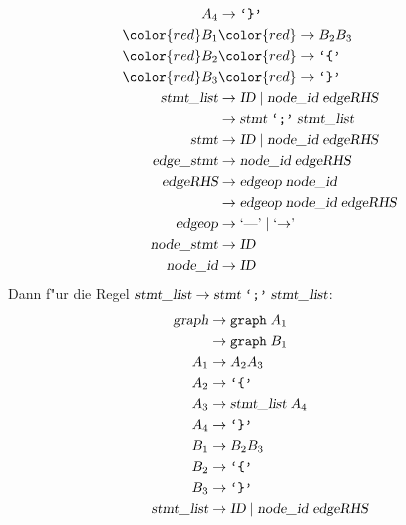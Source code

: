 \begin{loesung}
\begin{teilaufgaben}
\begin{align*}
A_4                &\rightarrow \texttt{`\}'}\\
\color{red}B_1     &\color{red}\rightarrow B_2B_3\\
\color{red}B_2     &\color{red}\rightarrow \texttt{`\{'}\\
\color{red}B_3     &\color{red}\rightarrow \texttt{`\}'}\\
\textsl{stmt\_list}&\rightarrow \textsl{ID}\; |\;
                                \textsl{node\_id}\; \textsl{edgeRHS} \\
                   &\rightarrow \textsl{stmt}\; \texttt{`;'}\; \textsl{stmt\_list}\\
\textsl{stmt}      &\rightarrow \textsl{ID}\; |\;
                                \textsl{node\_id}\; \textsl{edgeRHS} \\
\textsl{edge\_stmt}&\rightarrow \textsl{node\_id}\; \textsl{edgeRHS} \\
\textsl{edgeRHS}   &\rightarrow \textsl{edgeop}\; \textsl{node\_id}\\
                   &\rightarrow \textsl{edgeop}\; \textsl{node\_id}\; \textsl{edgeRHS}\\
\textsl{edgeop}    &\rightarrow \textrm{`\text{---}'}\; |\; \textrm{`$\rightarrow$'}\; \\
\textsl{node\_stmt}&\rightarrow \textsl{ID} \\
\textsl{node\_id}  &\rightarrow \textsl{ID}
\end{align*}
Dann f"ur die Regel
$\textsl{stmt\_list}\rightarrow \textsl{stmt}\; \texttt{`;'}\; \textsl{stmt\_list}$:
\begin{align*}
\textsl{graph}     &\rightarrow \texttt{graph}\; A_1 \\
                   &\rightarrow \texttt{graph}\; B_1 \\
A_1                &\rightarrow A_2A_3\\
A_2                &\rightarrow \texttt{`\{'}\\
A_3                &\rightarrow \textsl{stmt\_list}\;A_4\\
A_4                &\rightarrow \texttt{`\}'}\\
B_1                &\rightarrow B_2B_3\\
B_2                &\rightarrow \texttt{`\{'}\\
B_3                &\rightarrow \texttt{`\}'}\\
\textsl{stmt\_list}&\rightarrow \textsl{ID}\; |\;
                                \textsl{node\_id}\; \textsl{edgeRHS} \\

\end{align*}
\end{teilaufgaben}
\end{loesung}
